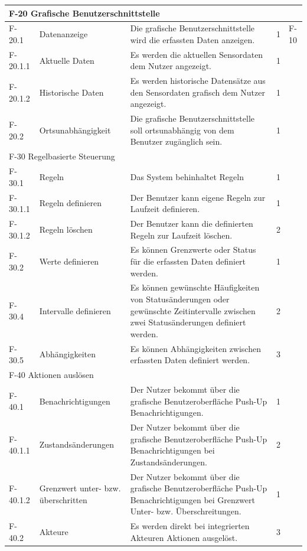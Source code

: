 \begin{tabularx}{\textwidth}{|l|X|X|l|l|}
    \hline
    \multicolumn{5}{|l|}{F-20 Grafische Benutzerschnittstelle}\\
    \hline
    F-20.1   & Datenanzeige & Die grafische Benutzerschnittstelle wird die erfassten Daten anzeigen. & 1 & F-10\\
    F-20.1.1 & Aktuelle Daten & Es werden die aktuellen Sensordaten dem Nutzer angezeigt. & 1 & \\
    F-20.1.2 & Historische Daten & Es werden historische Datensätze aus den Sensordaten grafisch dem Nutzer angezeigt. & 1 & \\
    F-20.2 & Ortsunabhängigkeit & Die grafische Benutzerschnittstelle soll ortsunabhängig von dem Benutzer zugänglich sein. & 1 & \\
    \hline
    \multicolumn{5}{|l|}{F-30 Regelbasierte Steuerung}\\
    \hline
    F-30.1 & Regeln & Das System behinhaltet Regeln & 1 & \\
    F-30.1.1 & Regeln definieren & Der Benutzer kann eigene Regeln zur Laufzeit definieren. & 1 & \\
    F-30.1.2 & Regeln löschen & Der Benutzer kann die definierten Regeln zur Laufzeit löschen. & 2 & \\
    F-30.2 & Werte definieren & Es können Grenzwerte oder Status für die erfassten Daten definiert werden. & 1 & \\
    F-30.4 & Intervalle definieren & Es können gewünschte Häufigkeiten von Statusänderungen oder gewünschte Zeitintervalle zwischen zwei Statusänderungen definiert werden. & 2 & \\
    F-30.5 & Abhängigkeiten & Es können Abhängigkeiten zwischen erfassten Daten definiert werden. & 3 & \\
    \hline
    \multicolumn{5}{|l|}{F-40 Aktionen auslösen}\\
    \hline
    F-40.1 & Benachrichtigungen & Der Nutzer bekommt über die grafische Benutzeroberfläche Push-Up Benachrichtigungen. & 1 & \\
    F-40.1.1 & Zustandsänderungen & Der Nutzer bekommt über die grafische Benutzeroberfläche Push-Up Benachrichtigungen bei Zustandsänderungen. & 2 & \\
    F-40.1.2 & Grenzwert unter- bzw. überschritten & Der Nutzer bekommt über die grafische Benutzeroberfläche Push-Up Benachrichtigungen bei Grenzwert Unter- bzw. Überschreitungen. & 1 & \\
    F-40.2 & Akteure & Es werden direkt bei integrierten Akteuren Aktionen ausgelöst. & 3 & \\

\end{tabularx}
